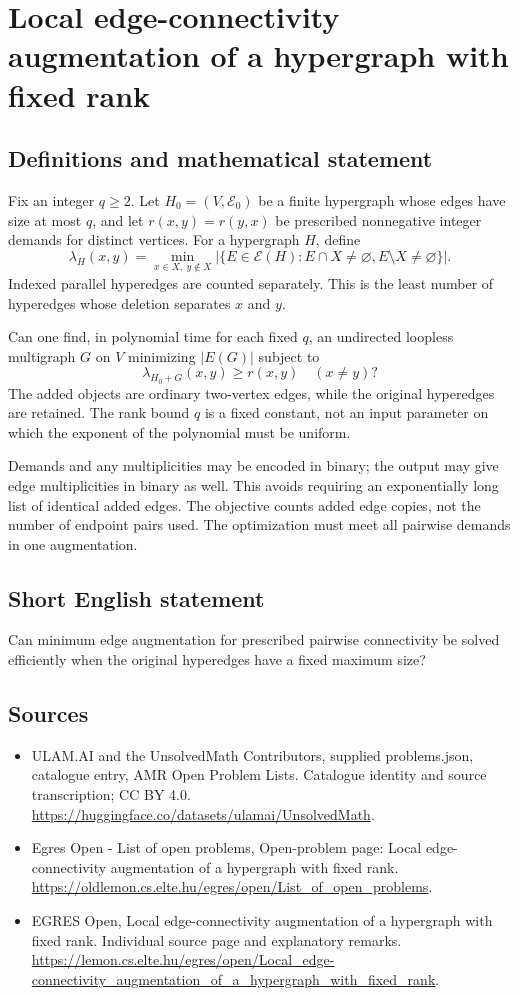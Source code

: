 \documentclass[11pt,a4paper]{article}
\begin{document}
\section*{Local edge-connectivity augmentation of a hypergraph with fixed rank}\label{statement}

\subsection{Definitions and mathematical statement}
Fix an integer $q\ge2$. Let $H_0=(V,\mathcal E_0)$ be a finite
hypergraph whose edges have size at most $q$, and let
$r(x,y)=r(y,x)$ be prescribed nonnegative integer demands for distinct
vertices. For a hypergraph $H$, define
\[
 \lambda_H(x,y)=\min_{x\in X,\ y\notin X}
       |\{E\in\mathcal E(H):E\cap X\ne\varnothing,
                              E\setminus X\ne\varnothing\}|.
\]
Indexed parallel hyperedges are counted separately. This is the least
number of hyperedges whose deletion separates $x$ and $y$.

Can one find, in polynomial time for each fixed $q$, an undirected
loopless multigraph $G$ on $V$ minimizing $|E(G)|$ subject to
\[
                          \lambda_{H_0+G}(x,y)\ge r(x,y)
                                        \quad(x\ne y)?
\]
The added objects are ordinary two-vertex edges, while the original
hyperedges are retained. The rank bound $q$ is a fixed constant,
not an input parameter on which the exponent of the polynomial must
be uniform.

Demands and any multiplicities may be encoded in binary; the output
may give edge multiplicities in binary as well. This avoids requiring
an exponentially long list of identical added edges. The objective
counts added edge copies, not the number of endpoint pairs used.
The optimization must meet all pairwise demands in one augmentation.
\subsection{Short English statement}
Can minimum edge augmentation for prescribed pairwise connectivity
be solved efficiently when the original hyperedges have a fixed maximum size?
\subsection{Sources}
\begin{itemize}
\item[S1] ULAM.AI and the UnsolvedMath Contributors, supplied problems.json, catalogue entry, AMR Open Problem Lists. Catalogue identity and source transcription; CC BY 4.0.
\url{https://huggingface.co/datasets/ulamai/UnsolvedMath}.
\item[S2] Egres Open - List of open problems, Open-problem page: Local edge-connectivity augmentation of a hypergraph with fixed rank. 
\url{https://oldlemon.cs.elte.hu/egres/open/List_of_open_problems}.
\item[S3] EGRES Open, Local edge-connectivity augmentation of a hypergraph with fixed rank. Individual source page and explanatory remarks.
\url{https://lemon.cs.elte.hu/egres/open/Local_edge-connectivity_augmentation_of_a_hypergraph_with_fixed_rank}.
\end{itemize}
\end{document}
